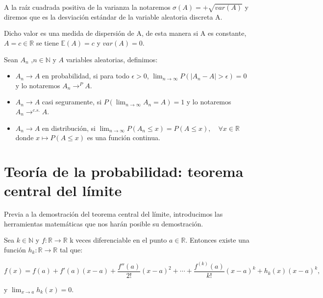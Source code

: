 \documentclass[../proyecto.tex]{memoir}
\begin{document}
\begin{defi}
A la raíz cuadrada positiva de la varianza la notaremos $\sigma(A)=+\sqrt{var(A)}$ y diremos que es la desviación estándar de la variable aleatoria discreta A. 
\end{defi}

Dicho valor es una medida de dispersión de A, de esta manera si A es constante, $A = c\in \mathds{R}$ se tiene $\mathds{E}(A)=c$ y $var(A) = 0$.


\begin{defi}

Sean ${A_n}$ ,$n\in \mathds{N}$ y $A$ variables aleatorias, definimos:

\begin{itemize}

\item $A_n \to A$ en probabilidad, si para todo $\epsilon > 0$, $\lim_{n\to\infty} P( |A_n-A|> \epsilon ) = 0$ y lo notaremos $A_n \to^{P} A$.

\item $A_n \to A$ casi seguramente, si $P(\lim_{n\to\infty} A_n=A) = 1$ y lo notaremos $A_n \to^{c.s.} A$.

\item $A_n \to A$ en distribución, si $\lim_{n \to \infty} P(A_n \leq x) = P(A \leq x),\quad \forall x \in \mathds{R}$ donde $x\mapsto P(A \leq x)$ es una función continua.

\end{itemize}
\end{defi}





\section{Teoría de la probabilidad: teorema central del límite}

Previa a la demostración del teorema central del límite, introducimos las herramientas matemáticas que nos harán posible su demostración.

\begin{teorema}

Sea $k \in \mathds{N}$ y $f: \mathds{R} \to \mathds{R}$ k veces diferenciable en el punto $a \in \mathds{R}$. Entonces existe una función $h_k: \mathds{R} \to \mathds{R}$ tal que:

$$
f(x)=f(a)+f'(a)(x-a)+\frac{f''(a)}{2!}(x-a)^2+\dotsb+\frac{f^{(k)}(a)}{k!}(x-a)^k + h_k(x)(x-a)^k,
$$

y $\lim_{x\to a} h_k(x) = 0$.
\end{teorema}
 
\end{document}
